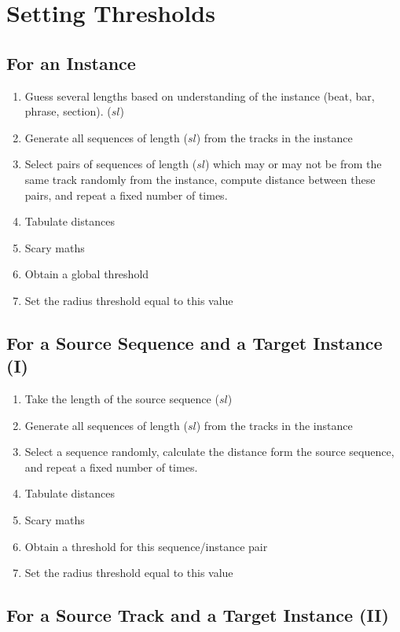 \documentclass[11pt]{article}
\begin{document}
\section{Setting Thresholds}

\subsection{For an Instance}

\begin{enumerate}
\item Guess several lengths based on understanding of the instance (beat, bar, phrase, section).   ($sl$) 
\item Generate all sequences of length   ($sl$)  from the tracks in the instance 
\item Select pairs of sequences of length ($sl$) which may or may not be from the same track randomly from the instance, compute distance between these pairs, and repeat a fixed number of times. 
\item Tabulate distances
\item Scary maths
 \item Obtain a global threshold 
 \item Set the radius threshold equal to this  value
 \end{enumerate}

\subsection{For a Source Sequence and a Target Instance (I)}

\begin{enumerate}
\item Take the length of the source sequence ($sl$)
\item Generate all sequences of length   ($sl$)  from the tracks in the instance
\item Select a sequence randomly, calculate the distance form the source sequence, and repeat a fixed number of times. 
\item Tabulate distances
\item Scary maths
 \item Obtain a  threshold for this sequence/instance pair 
 \item Set the radius threshold equal to this  value
 \end{enumerate}

\subsection{For a Source Track and a Target Instance (II)}
\end{document}
